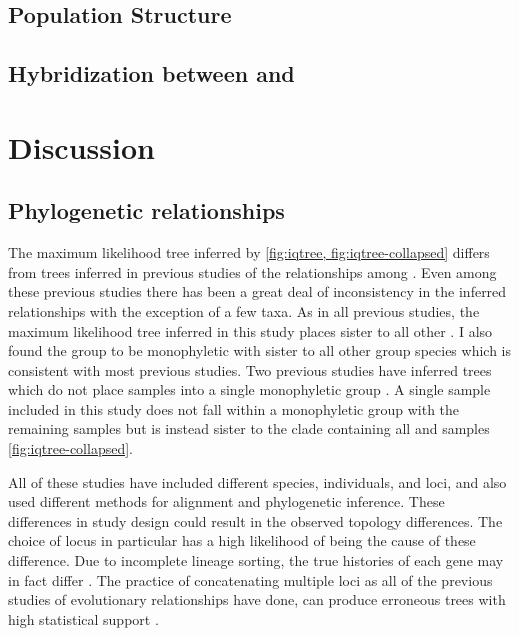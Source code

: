 \subsection{Population Structure}

\subsection{Hybridization between \fowl and \wood}


\section{Discussion}

\subsection{Phylogenetic relationships}
The maximum likelihood tree inferred by \iqtree \cref{fig:iqtree, fig:iqtree-collapsed} 
differs from trees inferred in previous studies of the relationships 
among \anaxyrus \parencite{fontenot2011,graybeal1997,masta2002,pramuk2007,pyron2011,portik2023}.
Even among these previous studies there has been a great deal of inconsistency in
the inferred relationships with the exception of a few taxa. 
As in all previous studies, the maximum likelihood tree inferred in this 
study places \punctatus sister to all other \anaxyrus.
I also found the \americanus group to be monophyletic with \microscaphus sister  
to all other \americanus group species which is consistent with most previous studies.
Two previous studies have inferred trees which do not place \fowl samples
into a single monophyletic group \parencite{masta2002,fontenot2011}.
A single \fowl sample included in this study does not fall within a monophyletic 
group with the remaining \fowl samples but is instead sister to the clade 
containing all \fowl and \wood samples \cref{fig:iqtree-collapsed}.

All of these studies have included different species, individuals, and loci, and 
also used different methods for alignment and phylogenetic inference. 
These differences in study design could result in the observed topology differences. 
The choice of locus in particular has a high likelihood of being the cause of these difference. 
Due to incomplete lineage sorting, the true histories of each gene may in fact differ \parencite{kingman1982}. 
The practice of concatenating multiple loci as all of the previous studies of
\anaxyrus evolutionary relationships have done, can produce erroneous trees  
with high statistical support \parencite{kubatko2007}.

